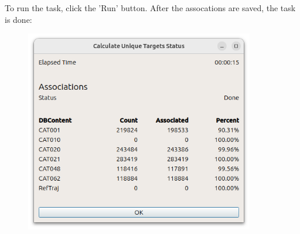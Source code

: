 To run the task, click the 'Run' button. After the assocations are saved, the task is done:

\begin{figure}[H]
  \center
    \includegraphics[width=10cm]{figures/tr_association_done.png}
\end{figure}
